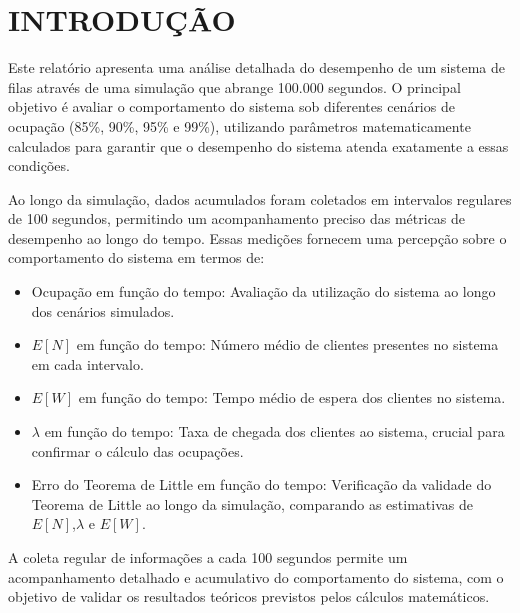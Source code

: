 \section{\large INTRODUÇÃO}
Este relatório apresenta uma análise detalhada do desempenho de um sistema de filas através de uma simulação que abrange 100.000 segundos. O principal objetivo é avaliar o comportamento do sistema sob diferentes cenários de ocupação (85\%, 90\%, 95\% e 99\%), utilizando parâmetros matematicamente calculados para garantir que o desempenho do sistema atenda exatamente a essas condições.

Ao longo da simulação, dados acumulados foram coletados em intervalos regulares de 100 segundos, permitindo um acompanhamento preciso das métricas de desempenho ao longo do tempo. Essas medições fornecem uma percepção sobre o comportamento do sistema em termos de:
\begin{itemize}
    \item Ocupação em função do tempo: Avaliação da utilização do sistema ao longo dos cenários simulados.
    \item $E[N]$ em função do tempo: Número médio de clientes presentes no sistema em cada intervalo.
    \item $E[W]$ em função do tempo: Tempo médio de espera dos clientes no sistema.
    \item $\lambda$ em função do tempo: Taxa de chegada dos clientes ao sistema, crucial para confirmar o cálculo das ocupações.
    \item Erro do Teorema de Little em função do tempo: Verificação da validade do Teorema de Little ao longo da simulação, comparando as estimativas de $E[N]$,$\lambda$ e $E[W]$.
\end{itemize}

A coleta regular de informações a cada 100 segundos permite um acompanhamento detalhado e acumulativo do comportamento do sistema, com o objetivo de validar os resultados teóricos previstos pelos cálculos matemáticos.